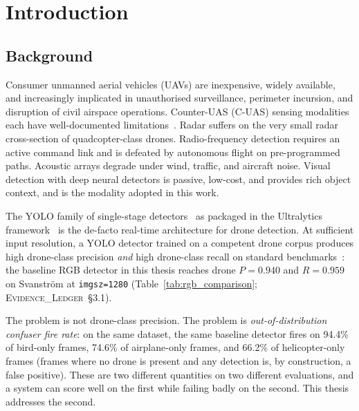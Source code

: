 \documentclass[12pt,a4paper,oneside,openright]{book}
\begin{document}
\tableofcontents
\newpage
{}
\setcounter{chapter}{0}


\chapter{Introduction}
\label{ch:introduction}

\section{Background}

Consumer unmanned aerial vehicles (UAVs) are inexpensive, widely available, and increasingly implicated in unauthorised surveillance, perimeter incursion, and disruption of civil airspace operations. Counter-UAS (C-UAS) sensing modalities each have well-documented limitations~\cite{shi2018counteruas}. Radar suffers on the very small radar cross-section of quadcopter-class drones. Radio-frequency detection requires an active command link and is defeated by autonomous flight on pre-programmed paths. Acoustic arrays degrade under wind, traffic, and aircraft noise. Visual detection with deep neural detectors is passive, low-cost, and provides rich object context, and is the modality adopted in this work.

The YOLO family of single-stage detectors~\cite{redmon2016yolo} as packaged in the Ultralytics framework~\cite{ultralytics2024} is the de-facto real-time architecture for drone detection. At sufficient input resolution, a YOLO detector trained on a competent drone corpus produces high drone-class precision \emph{and} high drone-class recall on standard benchmarks~\cite{svanstrom2021real,jiang2021antiuav}: the baseline RGB detector in this thesis reaches drone $P=0.940$ and $R=0.959$ on Svanstr\"om at \texttt{imgsz=1280} (Table~\ref{tab:rgb_comparison}; \textsc{Evidence\_Ledger}~\S3.1).

The problem is not drone-class precision. The problem is \emph{out-of-distribution confuser fire rate}: on the same dataset, the same baseline detector fires on 94.4\% of bird-only frames, 74.6\% of airplane-only frames, and 66.2\% of helicopter-only frames (frames where no drone is present and any detection is, by construction, a false positive). These are two different quantities on two different evaluations, and a system can score well on the first while failing badly on the second. This thesis addresses the second.
\end{document}
